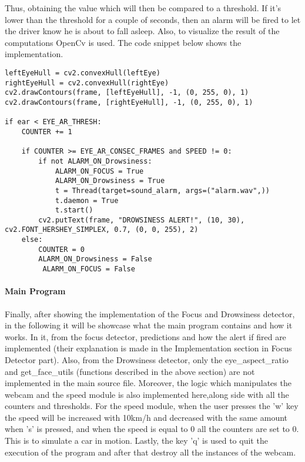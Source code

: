 Thus, obtaining the value which will then be compared to a threshold. If it's lower than the threshold for a couple of seconds, then an alarm will be fired to let the driver know he is about to fall asleep. Also, to visualize the result of the computations OpenCv is used. The code snippet below shows the implementation.

\begin{lstlisting}
leftEyeHull = cv2.convexHull(leftEye)
rightEyeHull = cv2.convexHull(rightEye)
cv2.drawContours(frame, [leftEyeHull], -1, (0, 255, 0), 1)
cv2.drawContours(frame, [rightEyeHull], -1, (0, 255, 0), 1)

if ear < EYE_AR_THRESH:
    COUNTER += 1

    if COUNTER >= EYE_AR_CONSEC_FRAMES and SPEED != 0:
        if not ALARM_ON_Drowsiness:
            ALARM_ON_FOCUS = True
            ALARM_ON_Drowsiness = True
            t = Thread(target=sound_alarm, args=("alarm.wav",))
            t.daemon = True
            t.start()
        cv2.putText(frame, "DROWSINESS ALERT!", (10, 30), cv2.FONT_HERSHEY_SIMPLEX, 0.7, (0, 0, 255), 2)
    else:
        COUNTER = 0
        ALARM_ON_Drowsiness = False
         ALARM_ON_FOCUS = False
\end{lstlisting}

\paragraph{Main Program}

Finally, after showing the implementation of the Focus and Drowsiness detector, in the following it will be showcase what the main program contains and how it works. In it, from the focus detector, predictions and how the alert if fired are implemented (their explanation is made in the Implementation section in Focus Detector part). Also, from the Drowsiness detector, only the eye\_aspect\_ratio and get\_face\_utils (functions described in the above section) are not implemented in the main source file. Moreover, the logic which manipulates the webcam and the speed module is also implemented here,along side with all the counters and thresholds. For the speed module, when the user presses the 'w' key the speed will be increased with 10km/h and decreased with the same amount when 's' is pressed, and when the speed is equal to 0 all the counters are set to 0. This is to simulate a car in motion. Lastly, the key 'q' is used to quit the execution of the program and after that destroy all the instances of the webcam. \par

